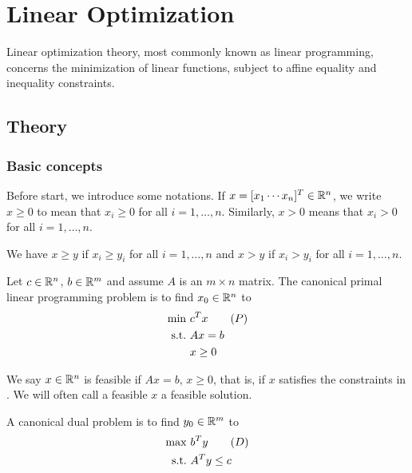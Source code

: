\setchapterpreamble[u]{\margintoc}
\chapter{Linear Optimization}

Linear optimization theory, most commonly known as linear programming, concerns the minimization of linear functions, subject to affine equality and inequality constraints.

\section{Theory}

\subsection{Basic concepts}

Before start, we introduce some notations.
If $x = [x_1 \cdots x_n]^T \in \mathbb{R}^n$, we write $x \ge 0$ to mean that $x_i \ge 0$ for all $i = 1, \dots, n$.
Similarly, $x > 0$ means that $x_i > 0$ for all $i = 1,\dots, n$.

We have $x \ge y$ if $x_i \ge y_i$ for all $i = 1, \dots, n$ and $x > y$ if $x_i > y_i$ for all $i = 1, \dots, n$.

\begin{definition}
Let $c \in \mathbb{R}^n$, $b \in \mathbb{R}^m$ and assume $A$ is an $m \times n$ matrix.
The canonical primal linear programming problem is to find $x_0 \in \mathbb{R}^n$ to
\begin{align}
\min \ & c^T x \tag{$P$} \labeq{LP_P} \\
\st & Ax = b \nonumber \\
& x \ge 0 \nonumber
\end{align}
\end{definition}

\begin{definition}
We say $x \in \mathbb{R}^n$ is feasible if $Ax = b$, $x \ge 0$, that is, if $x$ satisfies the constraints in .
We will often call a feasible $x$ a feasible solution.
\end{definition}

\begin{definition}
A canonical dual problem is to find $y_0 \in \mathbb{R}^m$ to
\begin{align}
\max \ & b^T y \tag{$D$} \labeq{LP_D} \\
\st & A^T y \le c \nonumber
\end{align}
\end{definition}

